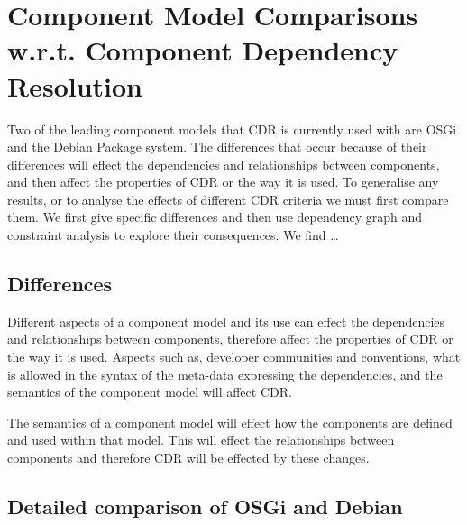 \chapter{Component Model Comparisons w.r.t. Component Dependency Resolution}
\label{comparison}

{}Two of the leading component models that CDR is currently used with are OSGi and the Debian Package system.
{}The differences that occur because of their differences will effect the dependencies and relationships between components,
{}and then affect the properties of CDR or the way it is used.
{}To generalise any results, or to analyse the effects of different CDR criteria we must first compare them.
{}We first give specific differences and then use dependency graph and constraint analysis to explore their consequences.
{}We find \ldots%


\section{Differences}
{}Different aspects of a component model and its use can effect the dependencies and relationships between components,
{}therefore affect the properties of CDR or the way it is used.
{}Aspects such as, developer communities and conventions, what is allowed in the syntax of the meta-data expressing the dependencies,
{}and the semantics of the component model will affect CDR.  



	
	

The semantics of a component model will effect how the components are defined and used within that model.
This will effect the relationships between components and therefore CDR will be effected by these changes.

\section{Detailed comparison of OSGi and Debian}

